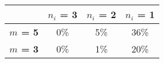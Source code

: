 \begin{tabular}{|l|c|c|c|}
\hline
&\textbf{$n_i$ = 3}&\textbf{$n_i$ = 2}&\textbf{$n_i$ = 1}\\\hline
\textbf{$m$ = 5}&0\%&5\%&36\%\\\hline
\textbf{$m$ = 3}&0\%&1\%&20\%\\\hline
\end{tabular}
